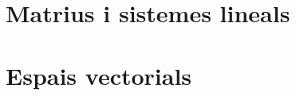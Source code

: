 \documentclass[12pt]{report}
\begin{document}

\chapter{Matrius i sistemes lineals}




\chapter{Espais vectorials}

\end{document}
